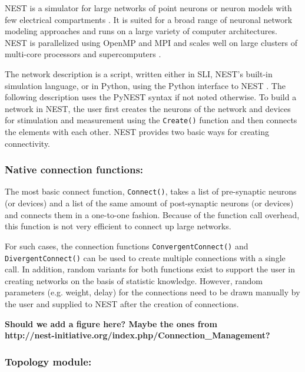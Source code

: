 \documentclass{frontiersSCNS} %
\newcommand{\tbw}[1]{{\bf\parindent0pt\color{red}#1}}
\begin{document}
NEST is a simulator for large networks of point neurons or neuron
models with few electrical compartments
\citep[http://www.nest-initiative.org;][]{Gewaltig_07_11204}. It is
suited for a broad range of neuronal network modeling approaches and
runs on a large variety of computer architectures. NEST is
parallelized using OpenMP \citep{OpenMPSpec} and MPI
\citep{MPIForum94} and scales well on large clusters of multi-core
processors and supercomputers \citep{Helias12_26}.

The network description is a script, written either in SLI, NEST's
built-in simulation language, or in Python, using the Python interface
to NEST \citep[PyNEST;][]{Eppler09_12}. The following description uses
the PyNEST syntax if not noted otherwise. To build a network in NEST,
the user first creates the neurons of the network and devices for
stimulation and measurement using the \texttt{Create()} function and
then connects the elements with each other. NEST provides two basic
ways for creating connectivity.

\subsubsection*{Native connection functions:}

The most basic connect function, \texttt{Connect()}, takes a list of
pre-synaptic neurons (or devices) and a list of the same amount of
post-synaptic neurons (or devices) and connects them in a one-to-one
fashion. Because of the function call overhead, this function is not
very efficient to connect up large networks.

For such cases, the connection functions \texttt{ConvergentConnect()}
and \texttt{DivergentConnect()} can be used to create multiple
connections with a single call. In addition, random variants for both
functions exist to support the user in creating networks on the basis
of statistic knowledge. However, random parameters (e.g. weight,
delay) for the connections need to be drawn manually by the user and
supplied to NEST after the creation of connections.

\tbw{Should we add a figure here? Maybe the ones
  from\\ http://nest-initiative.org/index.php/Connection\_Management?}

\subsubsection*{Topology module:}
\end{document}
